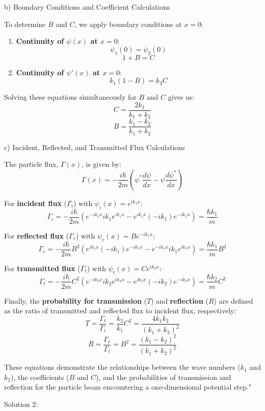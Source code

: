 b) Boundary Conditions and Coefficient Calculations

To determine \(B\) and \(C\), we apply boundary conditions at \(x = 0\):

\begin{enumerate}
    \item \textbf{Continuity of \(\psi(x)\) at \(x = 0\)}:
    \[ \psi_1(0) = \psi_2(0) \]
    \[ 1 + B = C \]

    \item \textbf{Continuity of \(\psi'(x)\) at \(x = 0\)}:
    \[ k_1(1 - B) = k_2C \]
\end{enumerate}

Solving these equations simultaneously for \(B\) and \(C\) gives us:
\[ C = \frac{2k_1}{k_1 + k_2} \]
\[ B = \frac{k_1 - k_2}{k_1 + k_2} \]

c) Incident, Reflected, and Transmitted Flux Calculations

The particle flux, \(\Gamma(x)\), is given by:
\[ \Gamma(x) = -\frac{i\hbar}{2m} \left(\psi^{*}\frac{d\psi}{dx} - \psi\frac{d\psi^{*}}{dx} \right) \]

For \textbf{incident flux} (\(\Gamma_i\)) with \(\psi_i(x) = e^{ik_1x}\):
\[ \Gamma_i = -\frac{i\hbar}{2m} \left(e^{-ik_1x}ik_1e^{ik_1x} - e^{ik_1x}(-ik_1)e^{-ik_1x} \right) = \frac{\hbar k_1}{m} \]

For \textbf{reflected flux} (\(\Gamma_r\)) with \(\psi_r(x) = Be^{-ik_1x}\):
\[ \Gamma_r = -\frac{i\hbar}{2m} B^2 \left(e^{ik_1x}(-ik_1)e^{-ik_1x} - e^{-ik_1x}ik_1e^{ik_1x} \right) = \frac{\hbar k_1}{m}B^2 \]

For \textbf{transmitted flux} (\(\Gamma_t\)) with \(\psi_t(x) = Ce^{ik_2x}\):
\[ \Gamma_t = -\frac{i\hbar}{2m} C^2 \left(e^{-ik_2x}ik_2e^{ik_2x} - e^{ik_2x}(-ik_2)e^{-ik_2x} \right) = \frac{\hbar k_2}{m}C^2 \]

Finally, the \textbf{probability for transmission} (\(T\)) and \textbf{reflection} (\(R\)) are defined as the ratio of transmitted and reflected flux to incident flux, respectively:
\[ T = \frac{\Gamma_t}{\Gamma_i} = \frac{k_2}{k_1}C^2 = \frac{4k_1k_2}{(k_1 + k_2)^2} \]
\[ R = \frac{\Gamma_r}{\Gamma_i} = B^2 = \frac{(k_1 - k_2)^2}{(k_1 + k_2)^2} \]

These equations demonstrate the relationships between the wave numbers (\(k_1\) and \(k_2\)), the coefficients (\(B\) and \(C\)), and the probabilities of transmission and reflection for the particle beam encountering a one-dimensional potential step."

Solution 2:

